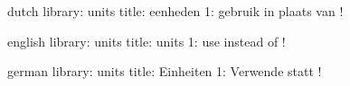 


\startmessages  dutch  library: units
  title: eenheden
      1: gebruik \string\Degrees\space\string\Celsius\space in plaats van \string\Celsius !
\stopmessages

\startmessages  english  library: units
  title: units
      1: use \string\Degrees\space\string\Celsius\space instead of \string\Celsius !
\stopmessages

\startmessages  german  library: units
  title: Einheiten
      1: Verwende \string\Degrees\space\string\Celsius\space statt \string\Celsius !
\stopmessages

\unprotect


